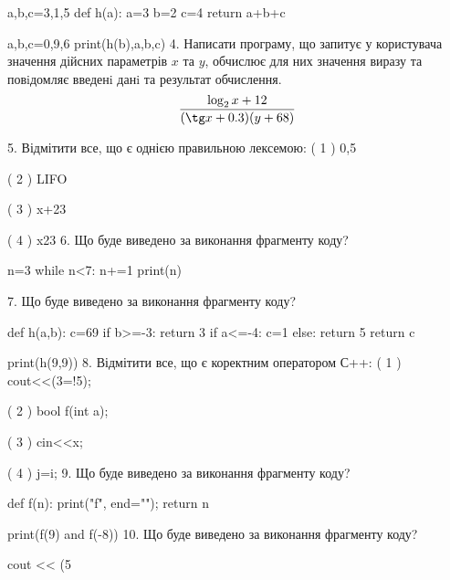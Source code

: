 \documentclass[11pt]{article}
\begin{document}
a,b,c=3,1,5
def h(a):
    a=3
    b=2
    c=4
    return a+b+c

a,b,c=0,9,6
print(h(b),a,b,c)
\vspace{5mm}
4. 
Написати програму, що запитує у користувача значення дійсних параметрів $x$ та $y$, обчислює для них значення виразу та повiдомляє введенi данi та результат обчислення.
$$\frac{\log_{2} x + 12}{(\tg x + 0.3) (y + 68)}$$ 

\vspace{5mm}
5. %
Відмітити все, що є однією правильною лексемою:
( 1 ) 0,5

( 2 ) LIFO

( 3 ) x+23

( 4 ) x23
\vspace{5mm}
6. Що буде виведено за виконання фрагменту коду?

n=3
while n<7:
    n+=1
print(n)

\vspace{5mm}
7. Що буде виведено за виконання фрагменту коду?

def h(a,b):
    c=69
    if b>=-3:
        return 3
    if a<=-4:
         c=1
    else: 
        return 5
    return c

print(h(9,9))
\vspace{5mm}
8. %
Відмітити все, що є коректним оператором С++:
( 1 ) cout<<(3=!5);

( 2 ) bool f(int a);

( 3 ) cin<<x;

( 4 ) j=i;
\vspace{5mm}
9. Що буде виведено за виконання фрагменту коду?

def f(n):
    print("f", end="");
    return n

print(f(9) and f(-8))
\vspace{5mm}
10. Що буде виведено за виконання фрагменту коду?

cout << (5 %
\vspace{5mm}










\newpage

\newpage
\end{document}
